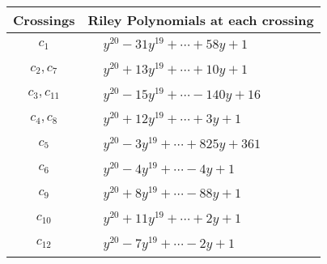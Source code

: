 \documentclass[1p]{elsarticle_modified}
\theoremstyle{definition}
\begin{document}
\begin{tabular}{m{50pt}|m{274pt}}
Crossings & \hspace{64pt}Riley Polynomials at each crossing \\
\hline $$\begin{aligned}c_{1}\end{aligned}$$&$\begin{aligned}
&y^{20}-31 y^{19}+\cdots+58 y+1
\end{aligned}$\\
\hline $$\begin{aligned}c_{2},c_{7}\end{aligned}$$&$\begin{aligned}
&y^{20}+13 y^{19}+\cdots+10 y+1
\end{aligned}$\\
\hline $$\begin{aligned}c_{3},c_{11}\end{aligned}$$&$\begin{aligned}
&y^{20}-15 y^{19}+\cdots-140 y+16
\end{aligned}$\\
\hline $$\begin{aligned}c_{4},c_{8}\end{aligned}$$&$\begin{aligned}
&y^{20}+12 y^{19}+\cdots+3 y+1
\end{aligned}$\\
\hline $$\begin{aligned}c_{5}\end{aligned}$$&$\begin{aligned}
&y^{20}-3 y^{19}+\cdots+825 y+361
\end{aligned}$\\
\hline $$\begin{aligned}c_{6}\end{aligned}$$&$\begin{aligned}
&y^{20}-4 y^{19}+\cdots-4 y+1
\end{aligned}$\\
\hline $$\begin{aligned}c_{9}\end{aligned}$$&$\begin{aligned}
&y^{20}+8 y^{19}+\cdots-88 y+1
\end{aligned}$\\
\hline $$\begin{aligned}c_{10}\end{aligned}$$&$\begin{aligned}
&y^{20}+11 y^{19}+\cdots+2 y+1
\end{aligned}$\\
\hline $$\begin{aligned}c_{12}\end{aligned}$$&$\begin{aligned}
&y^{20}-7 y^{19}+\cdots-2 y+1
\end{aligned}$\\
\hline
\end{tabular}\\~\\
\end{document}
